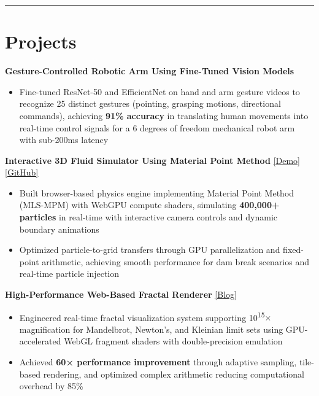 \documentclass[11pt]{article}
\begin{document}
\noindent\rule{\textwidth}{0.5pt}

\section*{\textcolor{modernblue}{\Large Projects}}
\textbf{Gesture-Controlled Robotic Arm Using Fine-Tuned Vision Models}
\begin{itemize}[leftmargin=*, topsep=1pt, itemsep=1pt, parsep=0pt]
\item Fine-tuned ResNet-50 and EfficientNet on hand and arm gesture videos to recognize 25 distinct gestures (pointing, grasping motions, directional commands), achieving \textbf{91\% accuracy} in translating human movements into real-time control signals for a 6 degrees of freedom mechanical robot arm with sub-200ms latency
\end{itemize}

\vspace{3pt}
\noindent\textbf{Interactive 3D Fluid Simulator Using Material Point Method} \href{https://dimitrichrysafis.github.io/media/misc/fluidemo/index.html}{\underline{[Demo]}} \href{https://github.com/DimitriChrysafis/3d-Volumetric-Fluid-Simulator-From-Scratch}{\underline{[GitHub]}}
\begin{itemize}[leftmargin=*, topsep=1pt, itemsep=1pt, parsep=0pt]
\item Built browser-based physics engine implementing Material Point Method (MLS-MPM) with WebGPU compute shaders, simulating \textbf{400,000+ particles} in real-time with interactive camera controls and dynamic boundary animations
\item Optimized particle-to-grid transfers through GPU parallelization and fixed-point arithmetic, achieving smooth performance for dam break scenarios and real-time particle injection
\end{itemize}

\vspace{3pt}
\noindent\textbf{High-Performance Web-Based Fractal Renderer} \href{https://dimitrichrysafis.github.io/#post/post6.md}{\underline{[Blog]}}
\begin{itemize}[leftmargin=*, topsep=1pt, itemsep=1pt, parsep=0pt]
\item Engineered real-time fractal visualization system supporting 10\textsuperscript{15}$\times$ magnification for Mandelbrot, Newton's, and Kleinian limit sets using GPU-accelerated WebGL fragment shaders with double-precision emulation
\item Achieved \textbf{60× performance improvement} through adaptive sampling, tile-based rendering, and optimized complex arithmetic reducing computational overhead by 85\%
\end{itemize}
\end{document}
